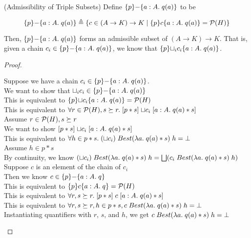 \begin{lemma}{(Admissibility of Triple Subsets)}
Define $\{{p}\}{-}\{{a:A}.\;{q(a)}\}$ to be 

\begin{displaymath}
\{{p}\}{-}\{{a:A}.\;{q(a)}\} \triangleq
         \{{{c \in (A \to K) \to K}\;|\;{ \{{p}\}{c}\{{a:A}.\;{q(a)}\} = \mathcal{P}(H) }}\}
\end{displaymath}

Then, $\{{p}\}{-}\{{a:A}.\;{q(a)}\}$ forms an admissible subset of $(A \to K) \to K$. 
That is, given a chain $c_i \in \{{p}\}{-}\{{a:A}.\;{q(a)}\}$, we know that 
$\{{p}\}{\sqcup_i c_i}\{{a:A}.\;{q(a)}\}$. 
\end{lemma}

\begin{proof}
\begin{tabbedproof}
\oo Suppose we have a chain $c_i \in \{{p}\}{-}\{{a:A}.\;{q(a)}\}$. \\
\ooo We want to show that $\sqcup_i c_i \in \{{p}\}{-}\{{a:A}.\;{q(a)}\}$ \\
\ooo This is equivalent to $\{{p}\}{\sqcup c_i}\{{a:A}.\;{q(a)}\} = \mathcal{P}(H)$ \\
\ooo This is equivalent to 
     $\forall r \in \mathcal{P}(H), s \succeq r.\; 
         [{p * s}]\;{\sqcup c_i}\;[{a:A}.\;{q(a) * s}]$ \\
\ooo Assume $r \in \mathcal{P}(H), s \succeq r$ \\
\oooo We want to show $[{p * s}]\;{\sqcup c_i}\;[{a:A}.\;{q(a) * s}]$ \\
\oooo This is equivalent to $\forall h \in p * s.\; (\sqcup c_i)\; Best(\lambda a.\;q(a)*s)\;h = \bot$ \\
\oooo Assume $h \in p * s$ \\ 
\ooooo By continuity, we know $(\sqcup c_i)\; Best(\lambda a.\;q(a)*s)\;h = 
                               \bigsqcup (c_i\;Best(\lambda a.\;q(a)*s)\;h)$ \\
\ooooo Suppose $c$ is an element of the chain of $c_i$ \\
\oooooo Then we know $c \in \{{p}\}{-}\{{a:A}.\;{q}\}$ \\
\oooooo This is equivalent to $\{{p}\}{c}\{{a:A}.\;{q}\} = \mathcal{P}(H)$ \\
\oooooo This is equivalent to $\forall r, s \succeq r.\; [{p*s}]\;{c}\;[{a:A}.\;{q(a)*s}]$ \\
\oooooo This is equivalent to $\forall r, s \succeq r, h \in p*s, c\;Best(\lambda a.\;q(a)*s)\;h = \bot$ \\
\oooooo Instantiating quantifiers with $r$, $s$, and $h$, we get $c\;Best(\lambda a.\;q(a)*s)\;h = \bot$\\

\end{tabbedproof}
\end{proof}

